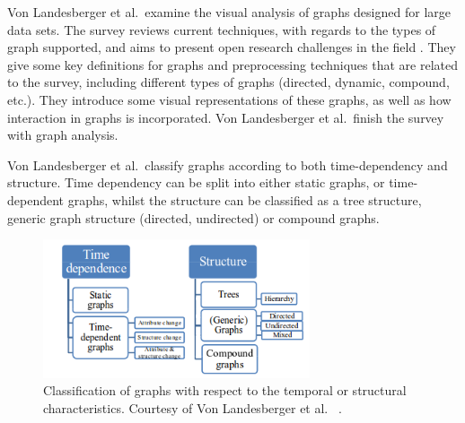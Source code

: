 Von Landesberger et al.\ examine the visual analysis of graphs designed for large data sets. The survey reviews current techniques, with regards to the types of graph supported, and aims to present open research challenges in the field \cite{von2011visual}.
They give some key definitions for graphs and preprocessing techniques that are related to the survey, including different types of graphs (directed, dynamic, compound, etc.). They introduce some visual representations of these graphs, as well as how interaction in graphs is incorporated. Von Landesberger et al.\ finish the survey with graph analysis.

Von Landesberger et al.\ classify graphs according to both time-dependency and structure. Time dependency can be split into either static graphs, or time-dependent graphs, whilst the structure can be classified as a tree structure, generic graph structure (directed, undirected) or compound graphs.

\begin{figure}[t]
\begin{center}
\includegraphics[width=0.7\textwidth]{images/von2011visual}
\caption{Classification of graphs with respect to the temporal or structural characteristics. Courtesy of Von Landesberger et al.\ \cite{von2011visual} .} \label{fig: von2011visual}
\end{center}
\end{figure}

